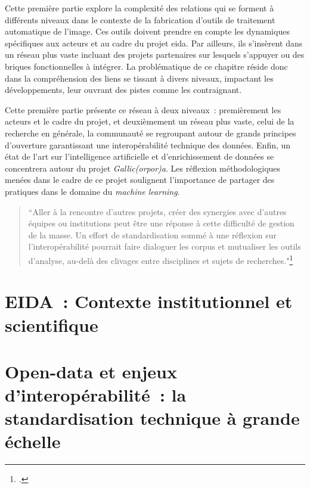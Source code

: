 \documentclass[a4paper,12pt,twoside]{book}
\newcommand{\eida}{\gls{eida}\xspace}
\newcommand{\ml}{\emph{machine learning}\xspace}
\newcommand{\gaga}{\emph{Gallic(orpor)a}\xspace}
\newcommand{\clearemptydoublepage}{\newpage{\pagestyle{empty}\cleardoublepage}}
\newenvironment{kwote}
  {
    \begin{quote}
    \begin{singlespace}
    \small
  }
  {
    \normalsize
    \end{singlespace}
    \end{quote}
  }
\begin{document}
Cette première partie explore la complexité des relations qui se forment
à différents niveaux dans le contexte de la fabrication d'outils de
traitement automatique de l'image. Ces outils doivent prendre en compte
les dynamiques spécifiques aux acteurs et au cadre du projet \eida. Par
ailleurs, ils s'insèrent dans un réseau plus vaste incluant des projets
partenaires sur lesquels s'appuyer ou des briques fonctionnelles à
intégrer. La problématique de ce chapitre réside donc dans la
compréhension des liens se tissant à divers niveaux, impactant les
développements, leur ouvrant des pistes comme les contraignant.

Cette première partie présente ce réseau à deux niveaux~: premièrement
les acteurs et le cadre du projet, et deuxièmement un réseau plus vaste,
celui de la recherche en générale, la communauté se regroupant autour de
grands principes d'ouverture garantissant une interopérabilité technique
des données. Enfin, un état de l'art sur l'intelligence artificielle et d'enrichissement de données se concentrera autour du projet \gaga. Les réflexion méthodologiques menées dans le cadre de ce projet soulignent l'importance de partager des pratiques dans le domaine du \ml. 

\begin{kwote}
``Aller à la rencontre d'autres projets, créer des synergies avec d'autres
équipes ou institutions peut être une réponse à cette difficulté de
gestion de la masse. Un effort de standardisation sommé à une réflexion
sur l'interopérabilité pourrait faire dialoguer les corpus et mutualiser
les outils d'analyse, au-delà des clivages entre disciplines et sujets
de recherches."\footcite{jacquot_decrire_2017}
\end{kwote}

\clearemptydoublepage

        \hypertarget{chapitre-1-eida-contexte-institutionnel-et-scientifique}{%
        \chapter{EIDA~: Contexte institutionnel et
scientifique}\label{chapitre-1-eida-contexte-institutionnel-et-scientifique}}

            
            
        \clearemptydoublepage
        
\hypertarget{chapitre-2-open-data-et-enjeux-interop}{%
\chapter{Open-data et enjeux d'interopérabilité~: la standardisation technique à grande échelle}\label{chapitre-2-open-data-et-enjeux-interop}}
\end{document}
